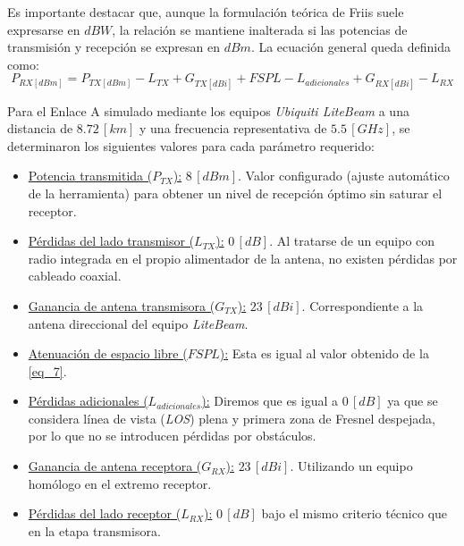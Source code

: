 Es importante destacar que, aunque la formulación teórica de Friis suele expresarse en $dBW$, la relación se mantiene inalterada si las potencias de transmisión y recepción se expresan en $dBm$. La ecuación general queda definida como:
\begin{equation}
    P_{RX[dBm]} = P_{TX[dBm]} - L_{TX} + G_{TX[dBi]} + FSPL - L_{adicionales} + G_{RX[dBi]} - L_{RX}
    \label{eq_8}
\end{equation}
    
Para el Enlace A simulado mediante los equipos \textit{Ubiquiti LiteBeam} a una distancia de $8.72 \, [km]$ y una frecuencia representativa de $5.5 \, [GHz]$, se determinaron los siguientes valores para cada parámetro requerido:
\begin{itemize}
    \item \underline{Potencia transmitida ($P_{TX}$):} $8 \, [dBm]$. Valor configurado (ajuste automático de la herramienta) para obtener un nivel de recepción óptimo sin saturar el receptor.
    
    \item \underline{Pérdidas del lado transmisor ($L_{TX}$):} $0 \, [dB]$. Al tratarse de un equipo con radio integrada en el propio alimentador de la antena, no existen pérdidas por cableado coaxial.
    
    \item \underline{Ganancia de antena transmisora ($G_{TX}$):} $23 \, [dBi]$. Correspondiente a la antena direccional del equipo \textit{LiteBeam}.
    
    \item \underline{Atenuación de espacio libre ($FSPL$):} Esta es igual al valor obtenido de la \autoref{eq_7}.
    
    \item \underline{Pérdidas adicionales ($L_{adicionales}$):} Diremos que es igual a $0 \, [dB]$ ya que se considera línea de vista (\textit{LOS}) plena y primera zona de Fresnel despejada, por lo que no se introducen pérdidas por obstáculos.
    
    \item \underline{Ganancia de antena receptora ($G_{RX}$):} $23 \, [dBi]$. Utilizando un equipo homólogo en el extremo receptor.
    
    \item \underline{Pérdidas del lado receptor ($L_{RX}$):} $0 \, [dB]$ bajo el mismo criterio técnico que en la etapa transmisora.
\end{itemize}

